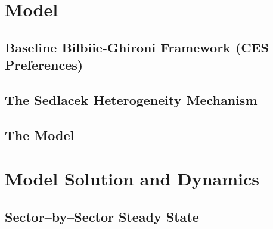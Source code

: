 \documentclass[a4paper,12pt]{article} %
\numberwithin{equation}{section} %
\numberwithin{figure}{section}
\numberwithin{table}{section}
\begin{document}
\section{Model}
\label{sec:model}

\subsection{Baseline Bilbiie-Ghironi Framework (CES Preferences)}
\label{sec:model-bilbiie}



\subsection{The Sedlacek Heterogeneity Mechanism}
\label{sec:model-sedlacek}



\subsection{The Model}
\label{sec:model-mine}


\section{Model Solution and Dynamics}
\label{sec:solution}


\subsection{Sector–by–Sector Steady State}
\label{sec:solution-steadystate}
\end{document}
